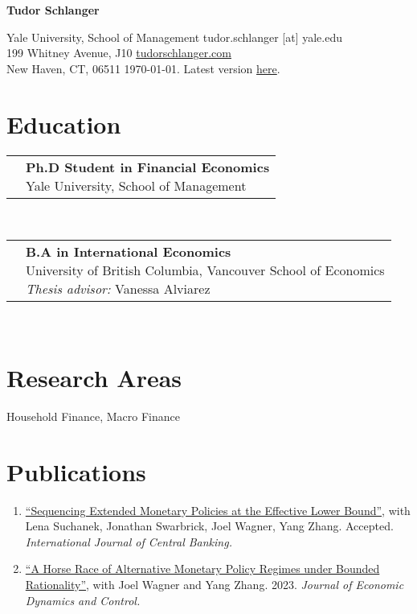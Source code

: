 \documentclass[letterpaper,10pt]{article}
\newcommand{\educItem}[4]{
		\vspace{0.2em} 	\begin{tabular*}{0.99\textwidth}[t]{lp{\labelsep}}
	      \eqparbox[t]{dates}{\ \ \ \ #1 \ \ \ \ } & \eqparbox[t]{educList}{\textbf{#2} \\ #3 \\ #4}
	   \end{tabular*} \vspace{0.2em} \\
		}
\newcommand{\pubSubHeadingListStart}{\begin{enumerate}[leftmargin=1em]}
\newcommand{\pubSubHeadingListEnd}{\end{enumerate}\vspace{-5pt}}
\newcommand{\pubItem}[3]{
	  \item{
	    \href{#1}{``#2''}{, with #3 \vspace{-2pt}}
	  }
	}
\begin{document}

\begin{center}
    \textbf{\large  Tudor Schlanger} 
\end{center}

Yale University, School of Management \hfill tudor.schlanger [at] yale.edu\\
199 Whitney Avenue, J10  			  \hfill  \href{tudorschlanger.com}{tudorschlanger.com} \\
New Haven, CT, 06511				  \hfill  \today. Latest version \href{https://github.com/tudorschlanger/cv}{here}.


\section{Education}
\educItem{2023-Present}{Ph.D Student in Financial Economics}{Yale University, School of Management}{} 
\educItem{2019}{B.A in International Economics}{University of British Columbia, Vancouver School of Economics}{\textit{Thesis advisor:} Vanessa Alviarez} 

\section{Research Areas}

\hspace{1em} Household Finance, Macro Finance



\section{Publications}

\pubSubHeadingListStart
	\pubItem{https://www.bankofcanada.ca/wp-content/uploads/2021/07/sdp2021-10.pdf}{Sequencing Extended Monetary Policies at the Effective Lower Bound}{Lena Suchanek, Jonathan Swarbrick, Joel Wagner, Yang Zhang. Accepted. \textit{International Journal of Central Banking.}}
	\pubItem{https://www.dropbox.com/scl/fi/j163cbxanc4ij4jcdauxt/draft_paper_20230724_prepublish.pdf?rlkey=zgvazmtdvw3xdgurn0ry6qykb&e=1&dl=0}{A Horse Race of Alternative Monetary Policy Regimes under Bounded Rationality}{Joel Wagner and Yang Zhang. 2023. \textit{Journal of Economic Dynamics and Control. }}
\pubSubHeadingListEnd
\end{document}
